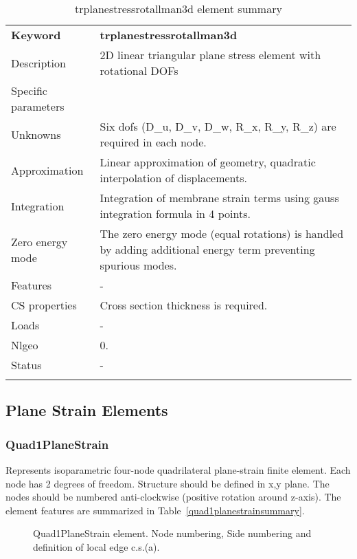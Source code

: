 \documentclass[a4paper]{article}
\newcommand{\templabel}{}%
\newcommand{\tempcaption}{}%
\newcounter{nelpar}
\newenvironment{elementsummary}[5]{%
  \gdef\tempcaption{#4}%
  \gdef\templabel{#5}%
  \setcounter{nelpar}{0}%
  \begin{center} %
    \begin{table}[!htb] %
      \begin{tabular}{|l|p{9cm}|}\hline %
        {\bf Keyword} & \bf{#1}\\ %
        {Description} & {#2}\\ %
        {Specific parameters} & {#3}\\ \hline %
}{
  \\ \hline %
      \end{tabular}%
      \caption{\tempcaption}%
      \label{\templabel}%
    \end{table}%
  \end{center}%
}
\newcommand{\elementDescription}[2]{{#1} & {#2}\\ }
\begin{document}
\begin{elementsummary}{trplanestressrotallman3d}{2D linear triangular plane stress element with rotational DOFs}{}{trplanestressrotallman3d element summary}{trplanestressrotallman3dsummary}
\elementDescription{Unknowns}{Six dofs (D\_u, D\_v, D\_w, R\_x, R\_y, R\_z) are required in each node.}
\elementDescription{Approximation}{Linear approximation of geometry, quadratic interpolation of displacements.}
\elementDescription{Integration}{Integration of membrane strain terms using gauss integration formula in 4 points.}
\elementDescription{Zero energy mode}{The zero energy mode (equal rotations) is handled by adding additional energy term preventing spurious modes.}

\elementDescription{Features}{-}
\elementDescription{CS properties}{Cross section thickness is required.}
\elementDescription{Loads}{-}
\elementDescription{Nlgeo}{0.}
\elementDescription{Status}{-}
\end{elementsummary}


\clearpage
\subsection{Plane Strain Elements}

\subsubsection{Quad1PlaneStrain}
Represents isoparametric four-node quadrilateral plane-strain
finite element. Each node has 2 degrees of freedom.
Structure should be defined in x,y plane. 
The nodes should be numbered anti-clockwise (positive rotation around
z-axis). The element features are summarized in Table~\ref{quad1planestrainsummary}.

\begin{figure}[htb]
 \centering
 \begin{makeimage}
  
 \end{makeimage}
 \caption{Quad1PlaneStrain element. Node numbering, Side numbering and
 definition of local edge c.s.(a).}
 \label{Quad1PlaneStrainfig}
\end{figure}
\end{document}
